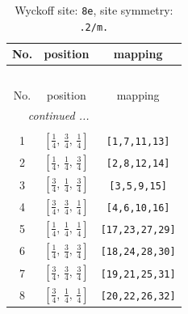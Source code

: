 \documentclass[fleqn,8pt]{jsarticle}
\begin{document}
\renewcommand{\arraystretch}{1.2}
\begin{longtable}{ccc}
\caption{Wyckoff site: {\tt 8e}, site symmetry: {\tt .2/m.}}
 \\
 \hline \hline
No. & position & mapping \\ \hline \endfirsthead

\multicolumn{2}{l}{\tablename\ \thetable{}} \\
 \hline \hline
No. & position & mapping \\ \hline \endhead

 \hline \hline
\multicolumn{2}{r}{\footnotesize\it continued ...} \\ \endfoot

 \hline \hline
\multicolumn{2}{r}{} \\ \endlastfoot

1 & $\left[ \frac{1}{4},\, \frac{3}{4},\, \frac{1}{4} \right]$ & {\tt [1,7,11,13]} \\ \hline
2 & $\left[ \frac{1}{4},\, \frac{1}{4},\, \frac{3}{4} \right]$ & {\tt [2,8,12,14]} \\ \hline
3 & $\left[ \frac{3}{4},\, \frac{1}{4},\, \frac{3}{4} \right]$ & {\tt [3,5,9,15]} \\ \hline
4 & $\left[ \frac{3}{4},\, \frac{3}{4},\, \frac{1}{4} \right]$ & {\tt [4,6,10,16]} \\ \hline
5 & $\left[ \frac{1}{4},\, \frac{1}{4},\, \frac{1}{4} \right]$ & {\tt [17,23,27,29]} \\ \hline
6 & $\left[ \frac{1}{4},\, \frac{3}{4},\, \frac{3}{4} \right]$ & {\tt [18,24,28,30]} \\ \hline
7 & $\left[ \frac{3}{4},\, \frac{3}{4},\, \frac{3}{4} \right]$ & {\tt [19,21,25,31]} \\ \hline
8 & $\left[ \frac{3}{4},\, \frac{1}{4},\, \frac{1}{4} \right]$ & {\tt [20,22,26,32]} \\
\end{longtable}
\renewcommand{\arraystretch}{1.2}
\end{document}

